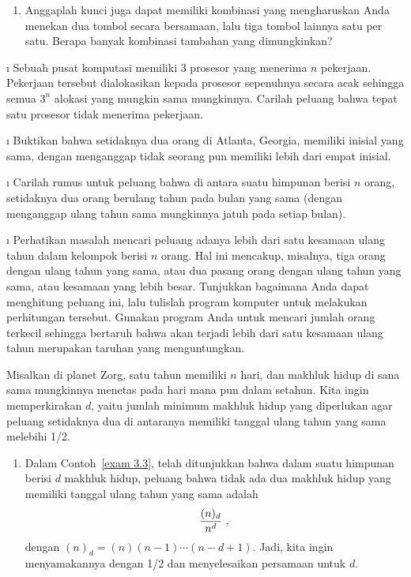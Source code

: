\begin{LJSItem}
\begin{enumerate}
\item Anggaplah kunci juga dapat memiliki kombinasi yang mengharuskan Anda menekan dua
tombol secara bersamaan, lalu tiga tombol lainnya satu per satu.  Berapa banyak kombinasi
tambahan yang dimungkinkan?
\end{enumerate}

\i\label{exer 3.1.15} Sebuah pusat komputasi memiliki 3 prosesor yang menerima $n$
pekerjaan.  Pekerjaan tersebut dialokasikan kepada prosesor sepenuhnya secara acak sehingga
semua $3^n$ alokasi yang mungkin sama mungkinnya.  Carilah peluang bahwa tepat satu
prosesor tidak menerima pekerjaan.

\i\label{exer 3.1.16} Buktikan bahwa setidaknya dua orang di Atlanta, Georgia, memiliki
inisial yang sama, dengan menganggap tidak seorang pun memiliki lebih dari empat inisial.

\i\label{exer 3.1.17} Carilah rumus untuk peluang bahwa di antara suatu himpunan berisi
$n$ orang, setidaknya dua orang berulang tahun pada bulan yang sama (dengan menganggap
ulang tahun sama mungkinnya jatuh pada setiap bulan).

\i\label{exer 3.1.18} Perhatikan masalah mencari peluang adanya lebih dari satu kesamaan
ulang tahun dalam kelompok berisi $n$ orang.  Hal ini mencakup, misalnya, tiga orang
dengan ulang tahun yang sama, atau dua pasang orang dengan ulang tahun yang sama, atau
kesamaan yang lebih besar.  Tunjukkan bagaimana Anda dapat menghitung peluang ini, lalu
tulislah program komputer untuk melakukan perhitungan tersebut.  Gunakan program Anda
untuk mencari jumlah orang terkecil sehingga bertaruh bahwa akan terjadi lebih dari satu
kesamaan ulang tahun merupakan taruhan yang menguntungkan.

\istar\label{exer 3.1.19} Misalkan di planet Zorg, satu tahun
memiliki $n$ hari, dan makhluk hidup di sana sama mungkinnya menetas pada hari mana pun
dalam setahun.  Kita ingin memperkirakan $d$, yaitu jumlah minimum makhluk hidup yang
diperlukan agar peluang setidaknya dua di antaranya memiliki tanggal ulang tahun yang
sama melebihi 1/2.
\begin{enumerate}
\item Dalam Contoh~\ref{exam 3.3}, telah ditunjukkan bahwa dalam suatu himpunan berisi
$d$ makhluk hidup, peluang bahwa tidak ada dua makhluk hidup yang memiliki tanggal
ulang tahun yang sama
adalah $${{(n)_d}\over{n^d}}\ ,$$ dengan $(n)_d = (n)(n-1)\cdots (n-d+1)$. Jadi, kita
ingin menyamakannya dengan 1/2 dan menyelesaikan persamaan untuk $d$.


\end{enumerate}
\end{LJSItem}
